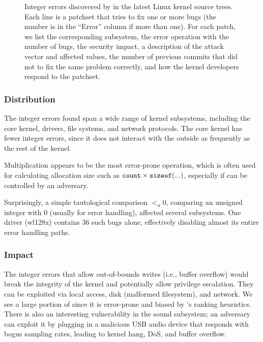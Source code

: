 \begin{figure*}
\centering
\footnotesize

\caption{Integer errors discovered by \sys in the latest Linux
kernel source trees.  Each line is a patchset that tries to fix one
or more bugs (the number is in the ``Error'' column if more than
one).  For each patch, we list the corresponding subsystem, the
error operation with the number of bugs, the security impact, a
description of the attack vector and affected values, the number
of previous commits that did not to fix the same problem correctly,
and how the kernel developers respond to the patchset.}
\label{f:data:linux}
\end{figure*}

\subsubsection{Distribution}

The integer errors \sys found span a wide range of kernel subsystems,
including the core kernel, drivers, file systems, and network protocols.
The core kernel has fewer integer errors, since it does not
interact with the outside as frequently as the rest of the kernel.

Multiplication appears to be the most error-prone operation, which
is often used for calculating allocation size such as $\texttt{count}
\times \texttt{sizeof}(...)$, especially if  can be controlled
by an adversary.

Surprisingly,  a simple tautological comparison $<_u 0$,
comparing an unsigned integer with 0 (usually for error handling),
affected several subsystems.
One driver (wl128x) contains 36 such bugs alone, effectively
disabling almost its entire error handling paths.

\subsubsection{Impact}

The integer errors that allow out-of-bounds writes (i.e., buffer
overflow) would break the integrity of the kernel and potentially
allow privilege escalation.  They can be exploited via local access,
disk (malformed filesystem), and network.  We see a large portion
of  since it is error-prone and biased by \sys's ranking
heuristics.
%
There is also an interesting vulnerability in the sound subsystem;
an adversary can exploit it by plugging in a malicious USB audio
device that responds with bogus sampling rates, leading to kernel
hang, DoS, and buffer overflow.

